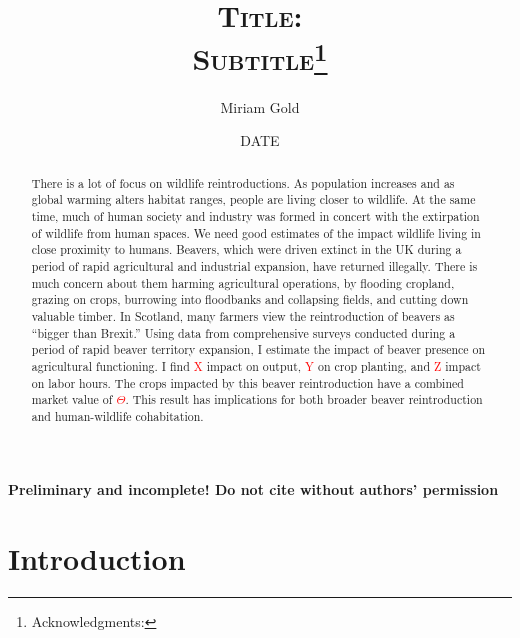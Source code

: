 \documentclass[11pt, english, letterpaper]{article}
\begin{document}
\justifying

\title{\vspace{-2em}\textsc{Title: \\ Subtitle}\thanks{Acknowledgments: }}

\author[1]{\small Miriam Gold}

\date{DATE}
\maketitle

\begin{center}
\vspace{-3em}
\textbf{Preliminary and incomplete! Do not cite without authors' permission}
\end{center}

\begin{abstract}
    \singlespacing 
    There is a lot of focus on wildlife reintroductions. As population increases and as global warming alters habitat ranges, people are living closer to wildlife. At the same time, much of human society and industry was formed in concert with the extirpation of wildlife from human spaces. We need good estimates of the impact wildlife living in close proximity to humans. Beavers, which were driven extinct in the UK during a period of rapid agricultural and industrial expansion, have returned illegally. There is much concern about them harming agricultural operations, by flooding cropland, grazing on crops, burrowing into floodbanks and collapsing fields, and cutting down valuable timber. In Scotland, many farmers view the reintroduction of beavers as ``bigger than Brexit.'' Using data from comprehensive surveys conducted during a period of rapid beaver territory expansion, I estimate the impact of beaver presence on agricultural functioning. I find \textcolor{red}{X} impact on output, \textcolor{red}{Y} on crop planting, and \textcolor{red}{Z} impact on labor hours. The crops impacted by this beaver reintroduction have a combined market value of \textcolor{red}{$\Theta$}. This result has implications for both broader beaver reintroduction and human-wildlife cohabitation. 
\end{abstract}

\newpage 

% 

\vspace{-5mm} \section{Introduction}
\label{sec:intro}

\end{document}
